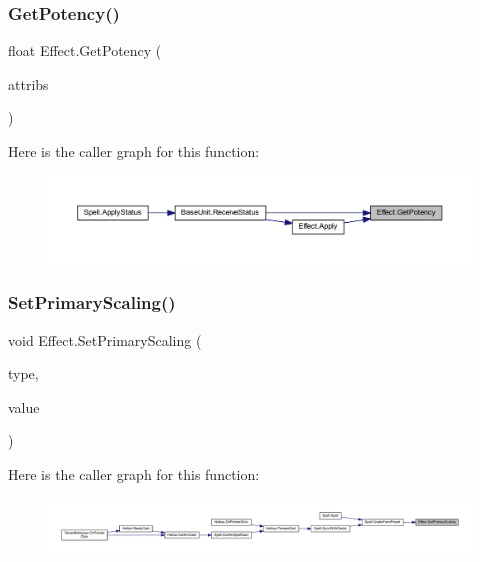 \subsubsection{\texorpdfstring{GetPotency()}{GetPotency()}}
{\footnotesize\ttfamily float Effect.\+Get\+Potency (\begin{DoxyParamCaption}\item[{\mbox{\hyperlink{class_attributes}{Attributes}}}]{attribs }\end{DoxyParamCaption})}

Here is the caller graph for this function\+:
\nopagebreak
\begin{figure}[H]
\begin{center}
\leavevmode
\includegraphics[width=350pt]{class_effect_a5af13ce8f65df2bfbba422a46e627fc0_icgraph}
\end{center}
\end{figure}
\mbox{\label{class_effect_a5c751c4432cf967c74fe16befbdbbe2e}} 
\subsubsection{\texorpdfstring{SetPrimaryScaling()}{SetPrimaryScaling()}}
{\footnotesize\ttfamily void Effect.\+Set\+Primary\+Scaling (\begin{DoxyParamCaption}\item[{\mbox{\hyperlink{class_effect_af0ada789de40f58c24c46bf8ed2f300c}{Scaling\+Type}}}]{type,  }\item[{float}]{value }\end{DoxyParamCaption})}

Here is the caller graph for this function\+:
\nopagebreak
\begin{figure}[H]
\begin{center}
\leavevmode
\includegraphics[width=350pt]{class_effect_a5c751c4432cf967c74fe16befbdbbe2e_icgraph}
\end{center}
\end{figure}
\mbox{\label{class_effect_a476b569a5adf97f1b691dcbb7e5cb325}} 
